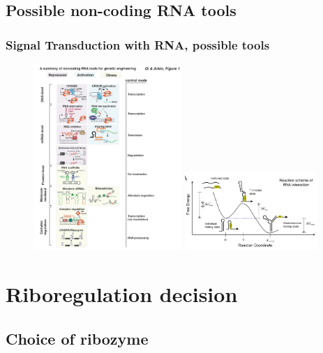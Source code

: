 \documentclass{beamer}
\begin{document}
\subsection{Possible non-coding RNA tools}
\begin{frame}
\frametitle{Signal Transduction with RNA, possible tools}

\begin{figure}
\includegraphics[width=0.5\textwidth]{riboregulation.png}
\hfill
\includegraphics[width=0.45\textwidth]{energy_riboregulation.png}
\end{figure}
\end{frame}

\section{Riboregulation decision}
\subsection{Choice of ribozyme}
\end{document}

